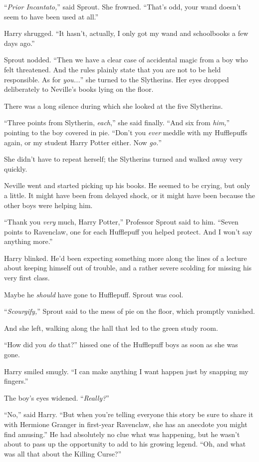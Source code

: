 ``\emph{Prior Incantato,}'' said Sprout. She frowned. ``That's odd, your wand doesn't seem to have been used at all.''

Harry shrugged. ``It hasn't, actually, I only got my wand and schoolbooks a few days ago.''

Sprout nodded. ``Then we have a clear case of accidental magic from a boy who felt threatened. And the rules plainly state that you are not to be held responsible. As for \emph{you...}'' she turned to the Slytherins. Her eyes dropped deliberately to Neville's books lying on the floor.

There was a long silence during which she looked at the five Slytherins.

``Three points from Slytherin, \emph{each},'' she said finally. ``And six from \emph{him,}'' pointing to the boy covered in pie. ``Don't you \emph{ever} meddle with my Hufflepuffs again, or my student Harry Potter either. Now \emph{go.}''

She didn't have to repeat herself; the Slytherins turned and walked away very quickly.

Neville went and started picking up his books. He seemed to be crying, but only a little. It might have been from delayed shock, or it might have been because the other boys were helping him.

``Thank you \emph{very} much, Harry Potter,'' Professor Sprout said to him. ``Seven points to Ravenclaw, one for each Hufflepuff you helped protect. And I won't say anything more.''

Harry blinked. He'd been expecting something more along the lines of a lecture about keeping himself out of trouble, and a rather severe scolding for missing his very first class.

Maybe he \emph{should} have gone to Hufflepuff. Sprout was cool.

``\emph{Scourgify,}'' Sprout said to the mess of pie on the floor, which promptly vanished.

And she left, walking along the hall that led to the green study room.

``How did you \emph{do} that?'' hissed one of the Hufflepuff boys as soon as she was gone.

Harry smiled smugly. ``I can make anything I want happen just by snapping my fingers.''

The boy's eyes widened. ``\emph{Really?}''

``No,'' said Harry. ``But when you're telling everyone this story be sure to share it with Hermione Granger in first-year Ravenclaw, she has an anecdote you might find amusing.'' He had absolutely no clue what was happening, but he wasn't about to pass up the opportunity to add to his growing legend. ``Oh, and what was all that about the Killing Curse?''


